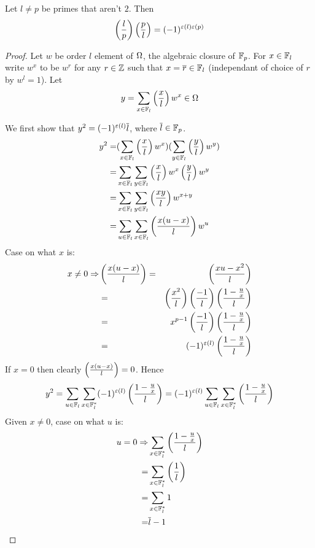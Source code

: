 \begin{prop}
    Let $l \ne p$ be primes that aren't $2$.
    Then \[\left(\frac{l}{p}\right)\left(\frac{p}{l}\right) = (-1)^{\varepsilon(l)\varepsilon(p)}\]
\end{prop}
\begin{proof}
    Let $w$ be order $l$ element of $\Omega$,
    the algebraic closure of $\mathbb{F}_p$.
    For $x \in \mathbb{F}_l$ write $w^x$ to be $w^r$ for any $r \in \mathbb{Z}$ such that
    $x = \overline{r} \in \mathbb{F}_l$ (independant of choice of $r$ by $w^l = 1$).
    Let 
    \[y = \sum_{x\in \mathbb{F}_l} \left(\frac{x}{l}\right) w^x \in \Omega\]

    We first show that $y^2 = (-1)^{\varepsilon(l)} \overline{l}$, 
    where $\overline{l} \in \mathbb{F}_p$.
    \begin{align*}
        y^2 =& 
        (\sum_{x \in \mathbb{F}_l} \left(\frac{x}{l}\right) w^x)
        (\sum_{y \in \mathbb{F}_l} \left(\frac{y}{l}\right) w^y)\\
        =& \sum_{x \in \mathbb{F}_l} \sum_{y \in \mathbb{F}_l} 
        \left(\frac{x}{l}\right) w^x \left(\frac{y}{l}\right) w^y\\
        =& \sum_{x \in \mathbb{F}_l} \sum_{y \in \mathbb{F}_l} \left(\frac{xy}{l}\right) w^{x+y}\\
        =& \sum_{u \in \mathbb{F}_l} \sum_{x \in \mathbb{F}_l} \left(\frac{x(u - x)}{l}\right) w^u
    \end{align*}
    Case on what $x$ is:
    \begin{align*}
        x \ne 0 \Rightarrow& \left(\frac{x(u - x)}{l}\right) =& \left(\frac{xu - x^2}{l}\right)\\
            & =& \left(\frac{x^2}{l}\right) \left(\frac{-1}{l}\right) \left(\frac{1-\frac{u}{x}}{l}\right)\\
            & =& x^{p - 1} \left(\frac{-1}{l}\right) \left(\frac{1 - \frac{u}{x}}{l}\right)\\
            & =& (-1)^{\varepsilon(l)} \left(\frac{1 - \frac{u}{x}}{l}\right)
    \end{align*}
    If $x = 0$ then clearly $\left(\frac{x(u - x)}{l}\right) = 0$.
    Hence 
    \[
        y^2 = \sum_{u \in \mathbb{F}_l} \sum_{x \in \mathbb{F}_l^*} 
        (-1)^{\varepsilon(l)} \left(\frac{1 - \frac{u}{x}}{l}\right)
        = (-1)^{\varepsilon(l)} \sum_{u \in \mathbb{F}_l}  \sum_{x \in \mathbb{F}_l^*}
        \left(\frac{1 - \frac{u}{x}}{l}\right)
    \]
    Given $x \ne 0$, case on what $u$ is:
    \begin{align*}
        u = 0 \Rightarrow &\sum_{x \in \mathbb{F}_l^*} \left(\frac{1 - \frac{u}{x}}{l}\right) \\
        = &\sum_{x \in \mathbb{F}_l^*} \left(\frac{1}{l}\right) \\
        = &\sum_{x \in \mathbb{F}_l^*} 1\\
        = & \overline{l} -1
    \end{align*}

\end{proof}
